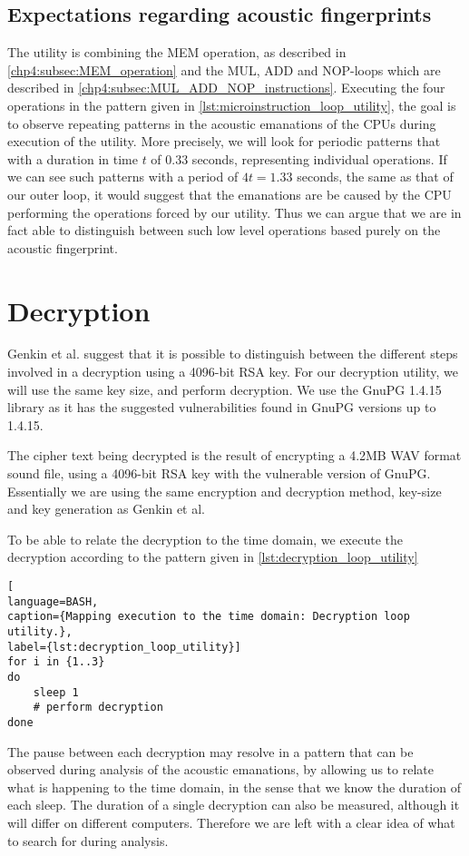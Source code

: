 \subsection{Expectations regarding acoustic fingerprints}
The utility is combining the MEM operation, as described in \autoref{chp4:subsec:MEM_operation} and the MUL, ADD and NOP-loops which are described in \autoref{chp4:subsec:MUL_ADD_NOP_instructions}.
Executing the four operations in the pattern given in \autoref{lst:microinstruction_loop_utility}, the goal is to observe repeating patterns in the acoustic emanations of the \gls{CPU}s during execution of the utility.
More precisely, we will look for periodic patterns that with a duration in time \(t\) of \(0.33\) seconds, representing individual operations. 
If we can see such patterns with a period of \(4t = 1.33\) seconds, the same as that of our outer loop, it would suggest that the emanations are be caused by the \gls{CPU} performing the operations forced by our utility.
Thus we can argue that we are in fact able to distinguish between such low level operations based purely on the acoustic fingerprint. 



\section{Decryption}\label{chp4:sec:decryption}
Genkin et al. suggest that it is possible to distinguish between the different steps involved in a decryption using a 4096-bit RSA key.
For our decryption utility, we will use the same key size, and perform decryption. 
We use the GnuPG 1.4.15~\cite{url:GnuPG_1.4.15} library as it has the suggested vulnerabilities found in GnuPG versions up to 1.4.15\cite[Sec.~9.1]{DBLP:conf/crypto/GenkinST14}. 

The cipher text being decrypted is the result of encrypting a 4.2MB WAV format sound file, using a 4096-bit RSA key with the vulnerable version of GnuPG.
Essentially we are using the same encryption and decryption method, key-size and key generation as Genkin et al. 

To be able to relate the decryption to the time domain, we execute the decryption according to the pattern given in \autoref{lst:decryption_loop_utility}

\begin{lstlisting}[
language=BASH, 
caption={Mapping execution to the time domain: Decryption loop utility.}, 
label={lst:decryption_loop_utility}]
for i in {1..3}
do
    sleep 1
    # perform decryption
done
\end{lstlisting}

The pause between each decryption may resolve in a pattern that can be observed during analysis of the acoustic emanations, by allowing us to relate what is happening to the time domain, in the sense that we know the duration of each sleep.
The duration of a single decryption can also be measured, although it will differ on different computers.
Therefore we are left with a clear idea of what to search for during analysis.
